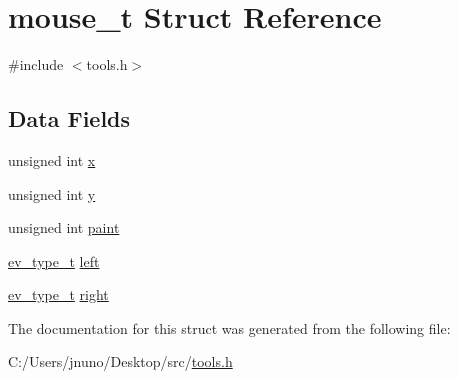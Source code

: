 \hypertarget{structmouse__t}{}\section{mouse\+\_\+t Struct Reference}
\label{structmouse__t}


{\ttfamily \#include $<$tools.\+h$>$}

\subsection*{Data Fields}
\begin{DoxyCompactItemize}
\item 
unsigned int \hyperlink{group___game_ga676e0da0ef83bbbdf42538e54b97506b}{x}
\item 
unsigned int \hyperlink{group___game_gac30de26db5f6d1c18c63913729adca7d}{y}
\item 
unsigned int \hyperlink{group___game_ga948c4c379ef991ba0160f8067ee6f56b}{paint}
\item 
\hyperlink{group___game_gaabca14b349ba212174a00ffc1d2a2f31}{ev\+\_\+type\+\_\+t} \hyperlink{group___game_gaecafb2f51c578021f704c30241e9032c}{left}
\item 
\hyperlink{group___game_gaabca14b349ba212174a00ffc1d2a2f31}{ev\+\_\+type\+\_\+t} \hyperlink{group___game_ga83501d338e4a35412684e3a442955660}{right}
\end{DoxyCompactItemize}


The documentation for this struct was generated from the following file\+:\begin{DoxyCompactItemize}
\item 
C\+:/\+Users/jnuno/\+Desktop/src/\hyperlink{tools_8h}{tools.\+h}\end{DoxyCompactItemize}
